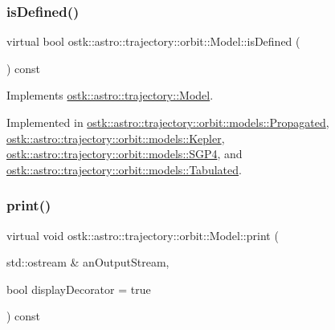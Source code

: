 \mbox{\label{classostk_1_1astro_1_1trajectory_1_1orbit_1_1_model_a13c5b5693dd86a072da0bd0e319bacc2}} 
\subsubsection{\texorpdfstring{is\+Defined()}{isDefined()}}
{\footnotesize\ttfamily virtual bool ostk\+::astro\+::trajectory\+::orbit\+::\+Model\+::is\+Defined (\begin{DoxyParamCaption}{ }\end{DoxyParamCaption}) const\hspace{0.3cm}{\ttfamily [pure virtual]}}



Implements \hyperlink{classostk_1_1astro_1_1trajectory_1_1_model_a0d5cf6f754905f06c0ec1e39618c20a1}{ostk\+::astro\+::trajectory\+::\+Model}.



Implemented in \hyperlink{classostk_1_1astro_1_1trajectory_1_1orbit_1_1models_1_1_propagated_a530fd6bc017c74dedc43ced5fe843a03}{ostk\+::astro\+::trajectory\+::orbit\+::models\+::\+Propagated}, \hyperlink{classostk_1_1astro_1_1trajectory_1_1orbit_1_1models_1_1_kepler_a4c74402d5483a51e5e0fe1920cd52ec4}{ostk\+::astro\+::trajectory\+::orbit\+::models\+::\+Kepler}, \hyperlink{classostk_1_1astro_1_1trajectory_1_1orbit_1_1models_1_1_s_g_p4_ab18e0666588bd517c190942b1a54ed18}{ostk\+::astro\+::trajectory\+::orbit\+::models\+::\+S\+G\+P4}, and \hyperlink{classostk_1_1astro_1_1trajectory_1_1orbit_1_1models_1_1_tabulated_ad114ba4762b54211f74f0aa3ac5eedae}{ostk\+::astro\+::trajectory\+::orbit\+::models\+::\+Tabulated}.

\mbox{\label{classostk_1_1astro_1_1trajectory_1_1orbit_1_1_model_a8ea45c1a6e51a6153ce3f72f5294f0c6}} 
\subsubsection{\texorpdfstring{print()}{print()}}
{\footnotesize\ttfamily virtual void ostk\+::astro\+::trajectory\+::orbit\+::\+Model\+::print (\begin{DoxyParamCaption}\item[{std\+::ostream \&}]{an\+Output\+Stream,  }\item[{bool}]{display\+Decorator = {\ttfamily true} }\end{DoxyParamCaption}) const\hspace{0.3cm}{\ttfamily [pure virtual]}}



